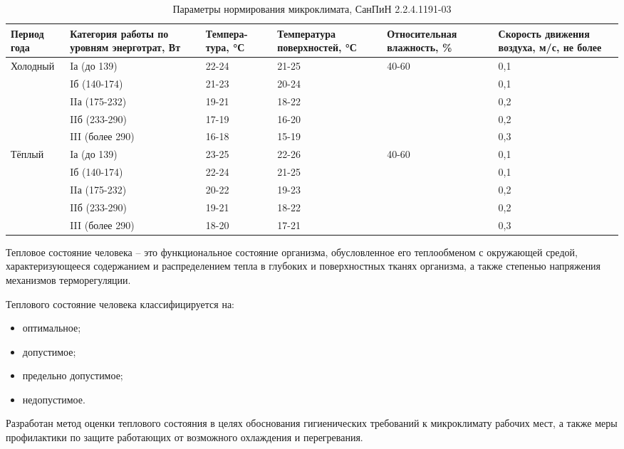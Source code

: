 \begin{table}[!h]
	\begin{center}
		\caption{Параметры нормирования микроклимата, СанПиН 2.2.4.1191-03}
		\begin{tabular}{|p{21mm}|p{27mm}|p{19mm}|p{27mm}|p{33mm}|p{21mm}|}
  		\hline
Период года	& Категория работы по уровням энерготрат, Вт & Темпера- тура, °С & Температура поверхностей, °С	& Относительная влажность, \% &	Скорость движения воздуха, м/с, не более \\ 
	\hline
 Холодный & Iа (до 139) & 22-24 & 21-25  & 40-60 & 0,1 \\ 
  &Iб (140-174) &21-23 &20-24 &  &0,1 \\
  &IIа (175-232) &19-21 &18-22 &  &0,2 \\
  &IIб (233-290) &17-19 &16-20 &  &0,2 \\
  &III (более 290) &16-18 &15-19 &  &0,3 \\ \hline

 Тёплый	 & Iа (до 139) &23-25   &22-26  & 40-60 &0,1  \\ 
  &Iб (140-174) & 22-24&21-25 &  & 0,1 \\ 
  &IIа (175-232) &20-22 &19-23 &   &0,2 \\
  &IIб (233-290) &19-21 &18-22 &   &0,2 \\
  &III (более 290) &18-20 &17-21 &   &0,3 \\ \hline
		\end{tabular}
		\label{tab:eco_climat}
	\end{center}
\end{table}

Тепловое состояние человека – это функциональное состояние организма, обусловленное его теплообменом с окружающей средой, характеризующееся содержанием и распределением тепла в глубоких и поверхностных тканях организма, а также степенью напряжения механизмов терморегуляции.

Теплового состояние человека классифицируется на:
\begin{itemize}
	\item оптимальное;
	\item допустимое;
	\item предельно допустимое;
	\item недопустимое.
\end{itemize}

Разработан метод оценки теплового состояния в целях обоснования гигиенических требований к микроклимату рабочих мест, а также меры профилактики по защите работающих от возможного охлаждения и перегревания.

